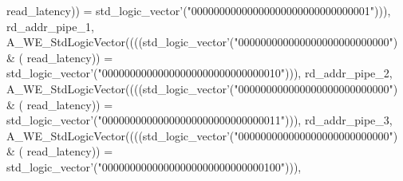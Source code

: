 \begin{DoxyCode}
{      read_latency}\textcolor{vhdlchar}{)}\textcolor{vhdlchar}{)} \textcolor{vhdlchar}{=} \textcolor{comment}{std\_logic\_vector}\textcolor{vhdlchar}{'}\textcolor{vhdlchar}{(}\textcolor{vhdllogic}{"00000000000000000000000000000001"}\textcolor{vhdlchar}{)}\textcolor{vhdlchar}{)}\textcolor{vhdlchar}{)}\textcolor{vhdlchar}{,} \textcolor{vhdlchar}{
      rd_addr_pipe_1}\textcolor{vhdlchar}{,} \textcolor{vhdlchar}{A\_WE\_StdLogicVector}\textcolor{vhdlchar}{(}\textcolor{vhdlchar}{(}\textcolor{vhdlchar}{(}\textcolor{vhdlchar}{(}\textcolor{comment}{std\_logic\_vector}\textcolor{vhdlchar}{'}\textcolor{vhdlchar}{(}\textcolor{vhdllogic}{"000000000000000000000000000"}\textcolor{vhdlchar}{)} \textcolor{vhdlchar}{&} \textcolor{vhdlchar}{(}\textcolor{vhdlchar}{
      read_latency}\textcolor{vhdlchar}{)}\textcolor{vhdlchar}{)} \textcolor{vhdlchar}{=} \textcolor{comment}{std\_logic\_vector}\textcolor{vhdlchar}{'}\textcolor{vhdlchar}{(}\textcolor{vhdllogic}{"00000000000000000000000000000010"}\textcolor{vhdlchar}{)}\textcolor{vhdlchar}{)}\textcolor{vhdlchar}{)}\textcolor{vhdlchar}{,} \textcolor{vhdlchar}{
      rd_addr_pipe_2}\textcolor{vhdlchar}{,} \textcolor{vhdlchar}{A\_WE\_StdLogicVector}\textcolor{vhdlchar}{(}\textcolor{vhdlchar}{(}\textcolor{vhdlchar}{(}\textcolor{vhdlchar}{(}\textcolor{comment}{std\_logic\_vector}\textcolor{vhdlchar}{'}\textcolor{vhdlchar}{(}\textcolor{vhdllogic}{"000000000000000000000000000"}\textcolor{vhdlchar}{)} \textcolor{vhdlchar}{&} \textcolor{vhdlchar}{(}\textcolor{vhdlchar}{
      read_latency}\textcolor{vhdlchar}{)}\textcolor{vhdlchar}{)} \textcolor{vhdlchar}{=} \textcolor{comment}{std\_logic\_vector}\textcolor{vhdlchar}{'}\textcolor{vhdlchar}{(}\textcolor{vhdllogic}{"00000000000000000000000000000011"}\textcolor{vhdlchar}{)}\textcolor{vhdlchar}{)}\textcolor{vhdlchar}{)}\textcolor{vhdlchar}{,} \textcolor{vhdlchar}{
      rd_addr_pipe_3}\textcolor{vhdlchar}{,} \textcolor{vhdlchar}{A\_WE\_StdLogicVector}\textcolor{vhdlchar}{(}\textcolor{vhdlchar}{(}\textcolor{vhdlchar}{(}\textcolor{vhdlchar}{(}\textcolor{comment}{std\_logic\_vector}\textcolor{vhdlchar}{'}\textcolor{vhdlchar}{(}\textcolor{vhdllogic}{"000000000000000000000000000"}\textcolor{vhdlchar}{)} \textcolor{vhdlchar}{&} \textcolor{vhdlchar}{(}\textcolor{vhdlchar}{
      read_latency}\textcolor{vhdlchar}{)}\textcolor{vhdlchar}{)} \textcolor{vhdlchar}{=} \textcolor{comment}{std\_logic\_vector}\textcolor{vhdlchar}{'}\textcolor{vhdlchar}{(}\textcolor{vhdllogic}{"00000000000000000000000000000100"}\textcolor{vhdlchar}{)}\textcolor{vhdlchar}{)}\textcolor{vhdlchar}{)}\textcolor{vhdlchar}{,} \textcolor{vhdlchar}{
}
\end{DoxyCode}
